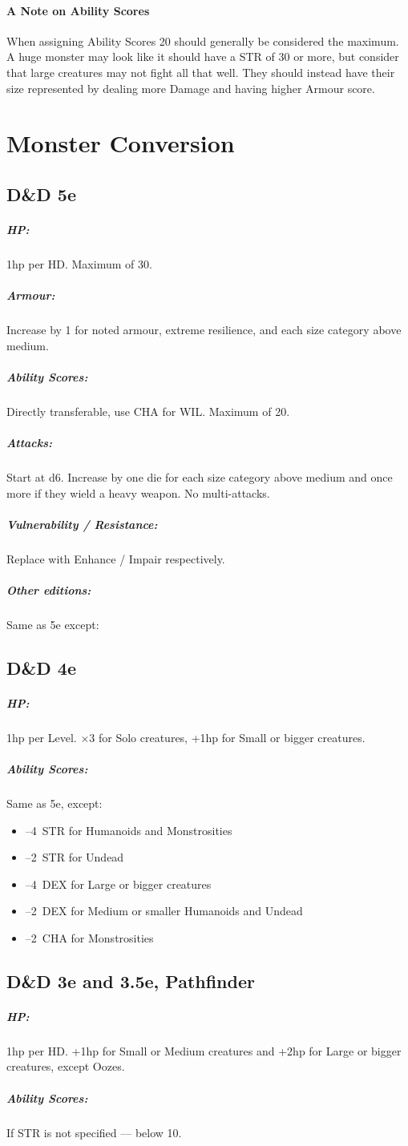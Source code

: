\documentclass[itdr]{subfiles}
\begin{document}
\paragraph{A Note on Ability Scores}
When assigning Ability Scores 20 should generally be considered the maximum. A huge monster may look like it should have a STR of 30 or more, but consider that large creatures may not fight all that well. They should instead have their size represented by dealing more Damage and having higher Armour score.


\vfill
\break

\section{Monster Conversion}

\subsection*{D\&D 5e}

\subparagraph{HP:} 1hp per HD. Maximum of 30.
\subparagraph{Armour:} Increase by 1 for noted armour, extreme resilience, and each size category above medium.
\subparagraph{Ability Scores:} Directly transferable, use CHA for WIL. Maximum of 20.
\subparagraph{Attacks:} Start at d6. Increase by one die for each size category above medium and once more if they wield a heavy weapon. No multi-attacks.
\subparagraph{Vulnerability / Resistance:} Replace with Enhance / Impair respectively.

\subparagraph{Other editions:} Same as 5e except:
\subsection*{D\&D 4e}
\subparagraph{HP:} 1hp per Level. $\times$3 for Solo creatures, +1hp for Small or bigger creatures.
\subparagraph{Ability Scores:} Same as 5e, except:
\begin{itemize}
	\item --4~STR for Humanoids and Monstrosities
	\item --2~STR for Undead
	\item --4~DEX for Large or bigger creatures
	\item --2~DEX for Medium or smaller Humanoids and Undead
	\item --2~CHA for Monstrosities
\end{itemize}

\subsection*{D\&D 3e and 3.5e, Pathfinder}
\subparagraph{HP:} 1hp per HD. +1hp for Small or Medium creatures and +2hp for Large or bigger creatures, except Oozes.
\subparagraph{Ability Scores:} If STR is not specified --- below 10.
\end{document}
